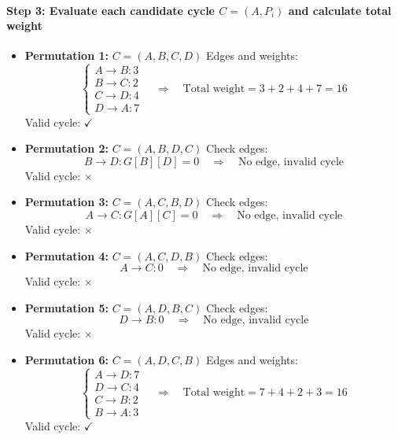 \paragraph{Step 3: Evaluate each candidate cycle $C = (A, P_i)$ and calculate total weight}

\begin{itemize}

\item \textbf{Permutation 1:} $C = (A, B, C, D)$  
Edges and weights:
\[
\begin{cases}
A \to B: 3 \\
B \to C: 2 \\
C \to D: 4 \\
D \to A: 7
\end{cases}
\quad \Rightarrow \quad
\text{Total weight} = 3 + 2 + 4 + 7 = 16
\]
Valid cycle: $\checkmark$

\vspace{0.5em}

\item \textbf{Permutation 2:} $C = (A, B, D, C)$  
Check edges:
\[
B \to D: G[B][D] = 0 \quad \Rightarrow \quad \text{No edge, invalid cycle}
\]
Valid cycle: $\times$

\vspace{0.5em}

\item \textbf{Permutation 3:} $C = (A, C, B, D)$  
Check edges:
\[
A \to C: G[A][C] = 0 \quad \Rightarrow \quad \text{No edge, invalid cycle}
\]
Valid cycle: $\times$

\vspace{0.5em}

\item \textbf{Permutation 4:} $C = (A, C, D, B)$  
Check edges:
\[
A \to C: 0 \quad \Rightarrow \quad \text{No edge, invalid cycle}
\]
Valid cycle: $\times$

\vspace{0.5em}

\item \textbf{Permutation 5:} $C = (A, D, B, C)$  
Check edges:
\[
D \to B: 0 \quad \Rightarrow \quad \text{No edge, invalid cycle}
\]
Valid cycle: $\times$

\vspace{0.5em}

\item \textbf{Permutation 6:} $C = (A, D, C, B)$  
Edges and weights:
\[
\begin{cases}
A \to D: 7 \\
D \to C: 4 \\
C \to B: 2 \\
B \to A: 3
\end{cases}
\quad \Rightarrow \quad
\text{Total weight} = 7 + 4 + 2 + 3 = 16
\]
Valid cycle: $\checkmark$

\end{itemize}

